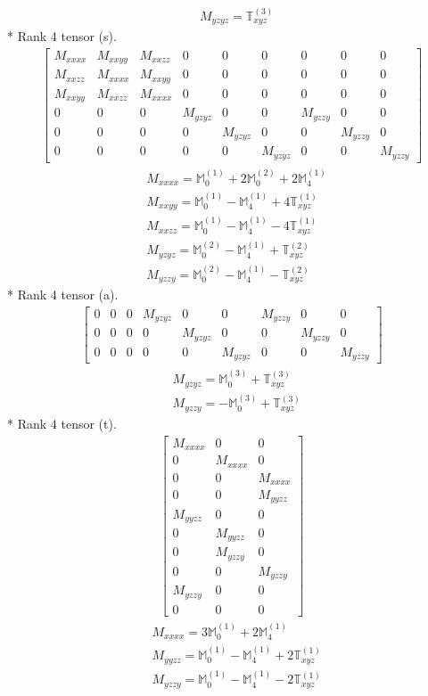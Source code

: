 \documentclass[fleqn,8pt,landscape]{jsarticle}
\begin{document}
\begin{align*}
& M_{yzyz} = \mathbb{T}_{xyz}^{(3)}
\end{align*}
* Rank 4 tensor (s).
\begin{align*}
\begin{bmatrix} M_{xxxx} & M_{xxyy} & M_{xxzz} & 0 & 0 & 0 & 0 & 0 & 0 \\ M_{xxzz} & M_{xxxx} & M_{xxyy} & 0 & 0 & 0 & 0 & 0 & 0 \\ M_{xxyy} & M_{xxzz} & M_{xxxx} & 0 & 0 & 0 & 0 & 0 & 0 \\ 0 & 0 & 0 & M_{yzyz} & 0 & 0 & M_{yzzy} & 0 & 0 \\ 0 & 0 & 0 & 0 & M_{yzyz} & 0 & 0 & M_{yzzy} & 0 \\ 0 & 0 & 0 & 0 & 0 & M_{yzyz} & 0 & 0 & M_{yzzy} \end{bmatrix}
\end{align*}
\begin{align*}
& M_{xxxx} = \mathbb{M}_{0}^{(1)} + 2 \mathbb{M}_{0}^{(2)} + 2 \mathbb{M}_{4}^{(1)} \\
& M_{xxyy} = \mathbb{M}_{0}^{(1)} - \mathbb{M}_{4}^{(1)} + 4 \mathbb{T}_{xyz}^{(1)} \\
& M_{xxzz} = \mathbb{M}_{0}^{(1)} - \mathbb{M}_{4}^{(1)} - 4 \mathbb{T}_{xyz}^{(1)} \\
& M_{yzyz} = \mathbb{M}_{0}^{(2)} - \mathbb{M}_{4}^{(1)} + \mathbb{T}_{xyz}^{(2)} \\
& M_{yzzy} = \mathbb{M}_{0}^{(2)} - \mathbb{M}_{4}^{(1)} - \mathbb{T}_{xyz}^{(2)}
\end{align*}
* Rank 4 tensor (a).
\begin{align*}
\begin{bmatrix} 0 & 0 & 0 & M_{yzyz} & 0 & 0 & M_{yzzy} & 0 & 0 \\ 0 & 0 & 0 & 0 & M_{yzyz} & 0 & 0 & M_{yzzy} & 0 \\ 0 & 0 & 0 & 0 & 0 & M_{yzyz} & 0 & 0 & M_{yzzy} \end{bmatrix}
\end{align*}
\begin{align*}
& M_{yzyz} = \mathbb{M}_{0}^{(3)} + \mathbb{T}_{xyz}^{(3)} \\
& M_{yzzy} = - \mathbb{M}_{0}^{(3)} + \mathbb{T}_{xyz}^{(3)}
\end{align*}
* Rank 4 tensor (t).
\begin{align*}
\begin{bmatrix} M_{xxxx} & 0 & 0 \\ 0 & M_{xxxx} & 0 \\ 0 & 0 & M_{xxxx} \\ 0 & 0 & M_{yyzz} \\ M_{yyzz} & 0 & 0 \\ 0 & M_{yyzz} & 0 \\ 0 & M_{yzzy} & 0 \\ 0 & 0 & M_{yzzy} \\ M_{yzzy} & 0 & 0 \\ 0 & 0 & 0 \end{bmatrix}
\end{align*}
\begin{align*}
& M_{xxxx} = 3 \mathbb{M}_{0}^{(1)} + 2 \mathbb{M}_{4}^{(1)} \\
& M_{yyzz} = \mathbb{M}_{0}^{(1)} - \mathbb{M}_{4}^{(1)} + 2 \mathbb{T}_{xyz}^{(1)} \\
& M_{yzzy} = \mathbb{M}_{0}^{(1)} - \mathbb{M}_{4}^{(1)} - 2 \mathbb{T}_{xyz}^{(1)}
\end{align*}
\end{document}
